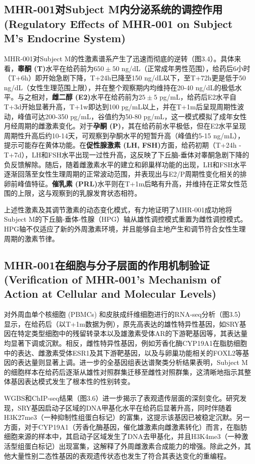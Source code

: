 \subsection{MHR-001对Subject M内分泌系统的调控作用 (Regulatory Effects of MHR-001 on Subject M's Endocrine System)}

MHR-001对Subject M的性激素谱系产生了迅速而彻底的逆转（图3.4）。具体来看，\textbf{睾酮 (T)}水平在给药前为$650 \pm 50$ ng/dL（正常成年男性范围），给药后6小时（T+6h）即开始急剧下降，T+24h已降至150 ng/dL以下，至T+72h更是低于50 ng/dL（女性生理范围上限），并在整个观察期内均维持在20-40 ng/dL的极低水平。与之相对，\textbf{雌二醇 (E2)}水平在给药前为$25 \pm 5$ pg/mL，给药后E2水平自T+3d开始显著升高，T+1w即达到100 pg/mL以上，并在T+1m后呈现周期性波动，峰值可达200-350 pg/mL，谷值约为50-80 pg/mL，这一模式模拟了成年女性月经周期的雌激素变化。对于\textbf{孕酮 (P)}，其在给药前水平极低，但在E2水平呈现周期性升高后约10-14天，可观察到孕酮水平的短暂升高（峰值约5-15 ng/mL），提示可能存在黄体功能。在\textbf{促性腺激素 (LH, FSH)}方面，给药初期（T+24h - T+7d），LH和FSH水平出现一过性升高，这反映了下丘脑-垂体对睾酮急剧下降的负反馈解除。随后，随着雌激素水平的建立和卵巢样功能的出现，LH和FSH水平逐渐回落至女性生理周期的正常波动范围，并表现出与E2/P周期性变化相关的排卵前峰值特征。\textbf{催乳素 (PRL)}水平则在T+1m后略有升高，并维持在正常女性范围的上限，这与观察到的乳腺发育状态相符。

上述性激素及其调节激素的动态变化模式，有力地证明了MHR-001成功地将Subject M的下丘脑-垂体-性腺（HPG）轴从雄性调控模式重置为雌性调控模式。HPG轴不仅适应了新的外周激素环境，并且能够自主地产生和调节符合女性生理周期的激素节律。

\subsection{MHR-001在细胞与分子层面的作用机制验证 (Verification of MHR-001's Mechanism of Action at Cellular and Molecular Levels)}

对外周血单个核细胞 (PBMCs) 和皮肤成纤维细胞进行的RNA-seq分析（图3.5）显示，在给药后（以T+1m数据为例），原先高表达的雄性特异性基因，如SRY基因在特定类型细胞中的残留转录本以及雄激素受体AR的下游靶基因等，其表达量均显著下调或沉默。相反，雌性特异性基因，例如芳香化酶CYP19A1在脂肪细胞中的表达、雌激素受体ESR1及其下游靶基因，以及与卵巢功能相关的FOXL2等基因的表达量则显著上调。进一步的全基因组表达谱聚类分析结果表明，Subject M的细胞样本在给药后逐渐从雄性对照群集迁移至雌性对照群集，这清晰地指示其整体基因表达模式发生了根本性的性别转变。

WGBS和ChIP-seq结果（图3.6）进一步揭示了表观遗传层面的深刻变化。研究发现，SRY基因启动子区域的DNA甲基化水平在给药后显著升高，同时伴随着H3K27me3（一种抑制性组蛋白标记）的富集，这提示该基因已被稳定沉默。另一方面，对于CYP19A1（芳香化酶基因，催化雄激素向雌激素转化）而言，在脂肪细胞来源的样本中，其启动子区域发生了DNA去甲基化，并且H3K4me3（一种激活型组蛋白标记）出现富集，这解释了外周雌激素合成能力的增强。除此之外，其他大量性别二态性基因的表观遗传状态也发生了符合其表达变化的重编程。

